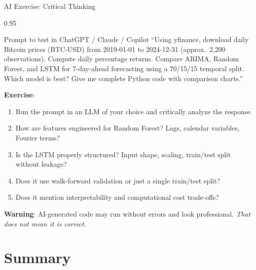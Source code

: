 \documentclass[9pt, aspectratio=169, t]{beamer}
\begin{document}
\begin{frame}{AI Exercise: Critical Thinking}
    \begin{cminipage}{0.95\textwidth}
    \vspace{-3mm}
    \begin{block}{\footnotesize Prompt to test in ChatGPT / Claude / Copilot}
        {\footnotesize
        ``Using yfinance, download daily Bitcoin prices (BTC-USD) from 2019-01-01 to 2024-12-31 (approx.\ 2{,}200 observations). Compute daily percentage returns. Compare ARIMA, Random Forest, and LSTM for 7-day-ahead forecasting using a 70/15/15 temporal split. Which model is best? Give me complete Python code with comparison charts.''
        }
    \end{block}
    \vspace{-2mm}
    {\footnotesize
    \textbf{Exercise}:
    \begin{enumerate}\setlength{\itemsep}{0pt}
        \item Run the prompt in an LLM of your choice and critically analyze the response.
        \item How are features engineered for Random Forest? Lags, calendar variables, Fourier terms?
        \item Is the LSTM properly structured? Input shape, scaling, train/test split without leakage?
        \item Does it use walk-forward validation or just a single train/test split?
        \item Does it mention interpretability and computational cost trade-offs?
    \end{enumerate}
    }
    \vspace{-2mm}
    \begin{alertblock}{}
        {\footnotesize \textbf{Warning}: AI-generated code may run without errors and look professional. \textit{That does not mean it is correct.}}
    \end{alertblock}
    \end{cminipage}
\end{frame}

\section{Summary}
\end{document}
